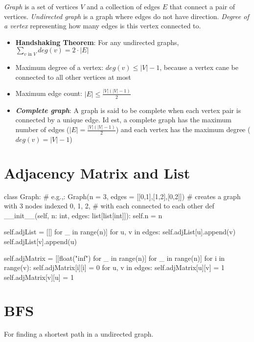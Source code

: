 
\textit{Graph} is a set of vertices $V$ and a collection of edges $E$ that connect a pair of vertices. \textit{Undirected graph} is a graph where edges do not have direction. \textit{Degree of a vertex} representing how many edges is this vertex connected to.

\begin{itemize}
  \item \textbf{Handshaking Theorem}: For any undirected graphs, \(\sum_{v \text{ in } V} deg(v) = 2 \cdot |E|\)
  \item Maximum degree of a vertex: $deg(v) \leq |V| - 1$, because a vertex cane be connected to all other vertices at most
  \item Maximum edge count: $|E| \leq \frac{|V|(|V| - 1)}{2}$
  \item \textbf{\textit{Complete graph}}: A graph is said to be complete when each vertex pair is connected by a unique edge. Id est, a complete graph has the maximum number of edges ($|E| = \frac{|V|(|V| - 1)}{2}$) and each vertex has the maximum degree ($deg(v) = |V| - 1$)
\end{itemize}

\section{Adjacency Matrix and List}

\begin{python}
class Graph:
    # e.g.,: Graph(n = 3, edges = [[0,1],[1,2],[0,2]])
    # creates a graph with 3 nodes indexed 0, 1, 2,
    # with each connected to each other
    def __init__(self, n: int, edges: list[list[int]]):
        self.n = n

        self.adjList = [[] for _ in range(n)]
        for u, v in edges:
            self.adjList[u].append(v)
            self.adjList[v].append(u)

        self.adjMatrix = [[float("inf") for _ in range(n)] for _ in range(n)]
        for i in range(v):
            self.adjMatrix[i][i] = 0
        for u, v in edges:
            self.adjMatrix[u][v] = 1
            self.adjMatrix[v][u] = 1
\end{python}

\section{BFS}

For finding a shortest path in a undirected graph.

